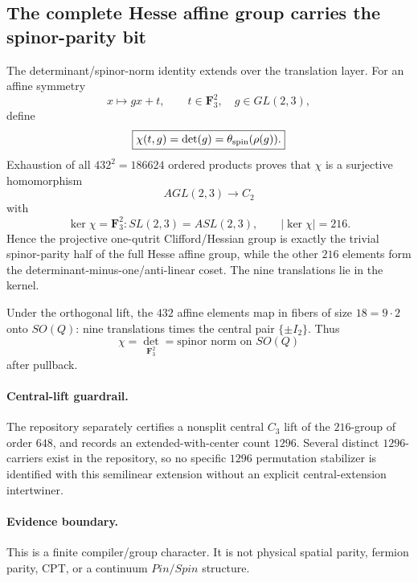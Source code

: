 \subsection*{The complete Hesse affine group carries the spinor-parity bit}

The determinant/spinor-norm identity extends over the translation layer.
For an affine symmetry
\[
 x\longmapsto gx+t,\qquad t\in\mathbf F_3^2,\quad g\in GL(2,3),
\]
define
\[
 \boxed{
 \chi(t,g)=\det(g)=\theta_{\rm spin}(\rho(g)).
 }
\]
Exhaustion of all \(432^2=186624\) ordered products proves that \(\chi\)
is a surjective homomorphism
\[
 AGL(2,3)\longrightarrow C_2
\]
with
\[
 \boxed{
 \ker\chi
 =
 \mathbf F_3^2:SL(2,3)
 =
 ASL(2,3),
 \qquad |\ker\chi|=216.
 }
\]
Hence the projective one-qutrit Clifford/Hessian group is exactly the trivial
spinor-parity half of the full Hesse affine group, while the other \(216\)
elements form the determinant-minus-one/anti-linear coset. The nine
translations lie in the kernel.

Under the orthogonal lift, the \(432\) affine elements map in fibers of size
\(18=9\cdot2\) onto \(SO(Q)\): nine translations times the central pair
\(\{\pm I_2\}\). Thus
\[
 \boxed{
 \chi=\det_{\mathbf F_3^2}=\text{spinor norm on }SO(Q)
 }
\]
after pullback.

\paragraph{Central-lift guardrail.}
The repository separately certifies a nonsplit central \(C_3\) lift of the
\(216\)-group of order \(648\), and records an extended-with-center count
\(1296\). Several distinct \(1296\)-carriers exist in the repository, so no
specific \(1296\) permutation stabilizer is identified with this semilinear
extension without an explicit central-extension intertwiner.

\paragraph{Evidence boundary.}
This is a finite compiler/group character. It is not physical spatial parity,
fermion parity, CPT, or a continuum \(Pin/Spin\) structure.

